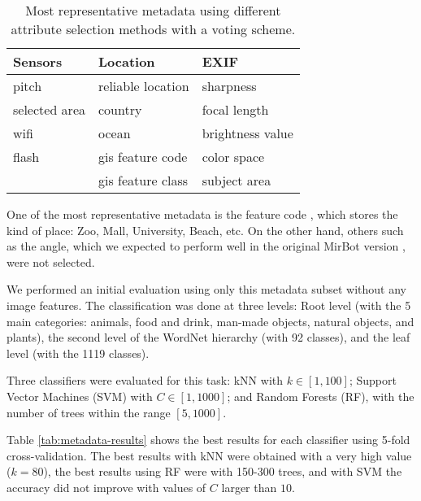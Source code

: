 \documentclass[final, twocolumn]{elsarticle}
\begin{document}
\begin{table}
\centering
\footnotesize
\begin{tabular}{lll}
\hline
\textbf{Sensors} & \textbf{Location}  & \textbf{EXIF}    \\ \hline
pitch           & reliable location  & sharpness        \\
selected area   & country            & focal length     \\
wifi            & ocean              & brightness value \\
flash           & gis feature code   & color space      \\
                & gis feature class  & subject area     \\
\hline
\end{tabular}
\caption{Most representative metadata using different attribute selection methods with a voting scheme.}
\label{tab:metadata-selected}
\end{table}

One of the most representative metadata is the feature code \cite{feat_codes}, which stores the kind of place: Zoo, Mall, University, Beach, etc. On the other hand, others such as the angle, which we expected to perform well in the original MirBot version \cite{MirBot:System}, were not selected.

We performed an initial evaluation using only this metadata subset without any image features. The classification was done at three levels: Root level (with the 5 main categories: animals, food and drink, man-made objects, natural objects, and plants), the second level of the WordNet hierarchy (with 92 classes), and the leaf level (with the 1119 classes).

Three classifiers were evaluated for this task: kNN with $k \in [1,100]$; Support Vector Machines (SVM) with $C \in [1,1000]$; and Random Forests (RF), with the number of trees within the range $[5,1000]$.

Table \ref{tab:metadata-results} shows the best results for each classifier using 5-fold cross-validation. The best results with kNN were obtained with a very high value ($k=80$), the best results using RF were with 150-300 trees, and with SVM the accuracy did not improve with values of $C$ larger than $10$.
\end{document}
